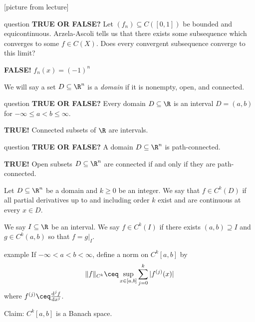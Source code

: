 \documentclass[class=article, crop=false]{standalone}
\begin{document}
[picture from lecture]

\begin{understandingcheck}{question}
  \textbf{TRUE OR FALSE?} Let $(f_n) \subseteq C([0,1])$ be bounded and equicontinuous. Arzela-Ascoli tells us that there exists some subsequence which converges to some $f\in C(X)$. Does every convergent subsequence converge to this limit?

  \textbf{FALSE!} $f_n(x) = (-1)^n$
\end{understandingcheck}

\begin{defn}
  We will say a set $D \subseteq \R^n$ is a \emph{domain} if it is nonempty, open, and connected.
\end{defn}

\begin{understandingcheck}{question}
  \textbf{TRUE OR FALSE?} Every domain $D \subseteq \R$ is an interval $D= (a,b)$ for $-\infty \leq  a < b \leq \infty$.

  \textbf{TRUE!} Connected subsets of $\R$ are intervals.
\end{understandingcheck}

\begin{understandingcheck}{question}
  \textbf{TRUE OR FALSE?} A domain $D\subseteq \R^n$ is path-connected.

  \textbf{TRUE!} Open subsets $D \subseteq \R^n$ are connected if and only if they are path-connected.
\end{understandingcheck}

\begin{defn}
  Let $D \subseteq \R^n$ be a domain and $k \geq 0$ be an integer. We say that $f \in C^k(D)$ if all partial derivatives up to and including order $k$ exist and are continuous at every $x \in D$.
\end{defn}

\begin{defn}
  We say $I \subseteq \R$ be an interval. We say $f \in C^k(I)$ if there exists $(a,b) \supseteq I$ and $g \in C^k(a,b)$ so that $f=g|_I$.
\end{defn}

\begin{understandingcheck}{example}
  If $-\infty < a < b < \infty$, define a norm on $C^k[a,b]$ by
    \[
      \|f\|_{C^k} \ceq \sup_{x \in [a,b]} \sum_{j=0}^{k} |f^{(j)}(x)|
    \]
  where $f^{(j)} \ceq \frac{\mathrm d^j f}{\mathrm d x^j}$.

  Claim: $C^k[a,b]$ is a Banach space.
\end{understandingcheck}
\end{document}

